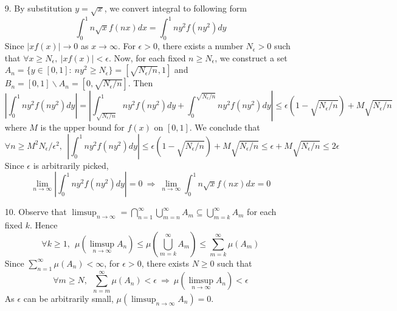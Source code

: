 \begin{itemize}
	\item[9.] By substitution $y= \sqrt{x}$, we convert integral to following form
	$$
	\int_{0}^1 n\sqrt{x}f(nx)dx = \int_{0}^1 ny^2f(ny^2)dy
	$$ 
	Since $\lvert xf(x)\rvert \rightarrow 0$ as $x\rightarrow \infty$. For $\epsilon > 0$, there exists a number $N_\epsilon >0$ such that $\forall x\ge N_\epsilon,~\lvert xf(x)\rvert<\epsilon$. Now, for each fixed $n \ge N_\epsilon$, we construct a set $A_n = \{y\in [0,1]:~ny^2\ge N_\epsilon \} = \left[\sqrt{N_\epsilon/n}, 1\right]$ and $B_n = [0,1]\backslash A_n = \left[0, \sqrt{N_\epsilon/n}\right]$. Then
	$$
	\left\lvert\int_{0}^1 ny^2f(ny^2)dy\right\rvert = \left\lvert\int_{\sqrt{N_\epsilon/n}}^1 ny^2f(ny^2)dy+ \int_{0}^{\sqrt{N_\epsilon/n}} ny^2f(ny^2)dy\right\rvert \le \epsilon \left(1-\sqrt{N_\epsilon/n}\right) + M\sqrt{N_\epsilon/n} 
	$$
	where $M$ is the upper bound for $f(x)$ on $[0,1]$. We conclude that 
	$$
	\forall n\ge M^2N_\epsilon/\epsilon^2, ~~ \left\lvert\int_{0}^1 ny^2f(ny^2)dy\right\rvert \le  \epsilon \left(1-\sqrt{N_\epsilon/n}\right) + M\sqrt{N_\epsilon/n} \le \epsilon +  M\sqrt{N_\epsilon/n}\le 2\epsilon
	$$
	Since $\epsilon$ is arbitrarily picked,  $$\lim_{n\rightarrow\infty} \left\lvert\int_{0}^1 ny^2f(ny^2)dy\right\rvert =0 ~\Rightarrow~ \lim_{n\rightarrow\infty} \int_{0}^1 n\sqrt{x}f(nx)dx=0$$
	
	\item[10.] Observe that $\limsup_{n\rightarrow \infty} = \bigcap_{n=1}^\infty \bigcup_{m=n}^\infty A_m \subseteq \bigcup_{m=k}^\infty A_m$ for each fixed $k$.
	Hence
	$$
	\forall k\ge 1,~~\mu\left(\limsup_{n\rightarrow \infty}A_n\right)\le \mu\left(\bigcup_{m=k}^\infty A_m\right) \le \sum_{m=k}^\infty \mu\left(A_m\right)
	$$
	Since $\sum_{n=1}^\infty \mu\left(A_n\right) < \infty$, for $\epsilon >0$, there exists $N\ge 0$ such that
	$$
	\forall m\ge N,~~\sum_{n=m}^\infty \mu\left(A_n\right) < \epsilon ~\Rightarrow~ \mu\left(\limsup_{n\rightarrow \infty}A_n\right)<\epsilon
	$$
	As $\epsilon$ can be arbitrarily small, $\mu\left(\limsup_{n\rightarrow \infty}A_n\right) = 0$.
\end{itemize}
